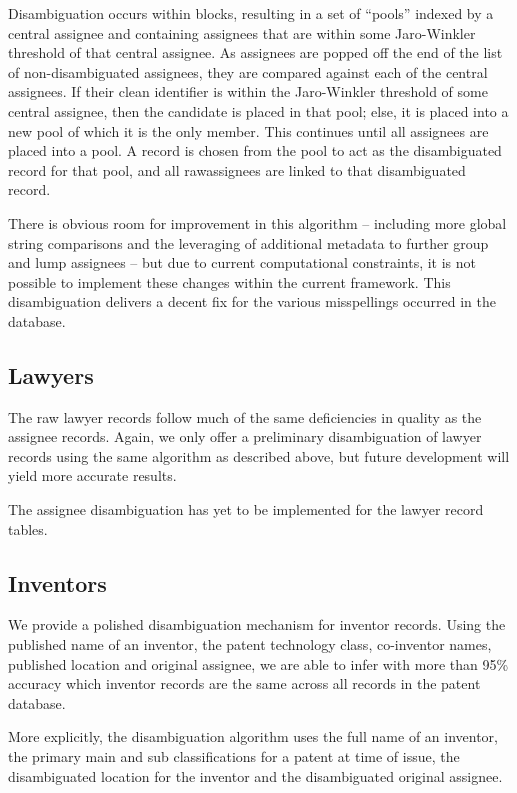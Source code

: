 Disambiguation occurs within blocks, resulting in a set of ``pools'' indexed by
a central assignee and containing assignees that are within some Jaro-Winkler
threshold of that central assignee. As assignees are popped off the end of the
list of non-disambiguated assignees, they are compared against each of the
central assignees. If their clean identifier is within the Jaro-Winkler
threshold of some central assignee, then the candidate is placed in that pool;
else, it is placed into a new pool of which it is the only member. This
continues until all assignees are placed into a pool. A record is chosen from
the pool to act as the disambiguated record for that pool, and all rawassignees
are linked to that disambiguated record.

There is obvious room for improvement in this algorithm -- including more
global string comparisons and the leveraging of additional metadata to
further group and lump assignees -- but due to current computational
constraints, it is not possible to implement these changes within the current
framework. This disambiguation delivers a decent fix for the various misspellings
occurred in the database.

\subsection{Lawyers}

The raw lawyer records follow much of the same deficiencies in quality
as the assignee records. Again, we only offer a preliminary disambiguation
of lawyer records using the same algorithm as described above, but
future development will yield more accurate results.

The assignee disambiguation has yet to be implemented for the lawyer
record tables.

\subsection{Inventors}

We provide a polished disambiguation mechanism for inventor records.
Using the published name of an inventor, the patent technology class,
co-inventor names, published location and original assignee, we are
able to infer with more than 95\% accuracy which inventor records
are the same across all records in the patent database.

More explicitly, the disambiguation algorithm uses the full name of an
inventor, the primary main and sub classifications for a patent at time of
issue, the disambiguated location for the inventor and the disambiguated
original assignee.

